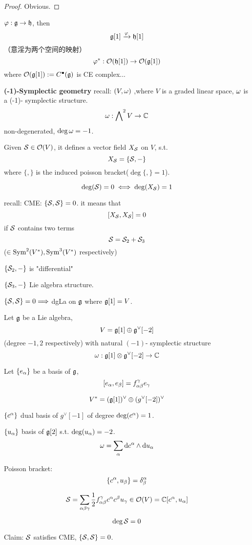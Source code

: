 \begin{proof}
Obvious.
\end{proof}

$\varphi:\mathfrak{g}\to\mathfrak{h}$, then
$$\mathfrak{g}[1]\xrightarrow{\varphi}\mathfrak{h}[1]$$
（意淫为两个空间的映射）
$$\varphi^*:\mathcal{O}(\mathfrak{h}[1])\to\mathcal{O}(\mathfrak{g}[1])$$
where $\mathcal{O}(\mathfrak{g}[1]):=C^{\bullet}(\mathfrak{g})$ is CE complex...

\textbf{(-1)-Symplectic geometry}
recall: $(V,\omega)$ ,where $V$ is a graded linear space, $\omega$ is a (-1)- symplectic structure.
$$\omega:\bigwedge\nolimits^{2}V\to\mathbb{C}$$
non-degenerated, $\deg\omega=-1$.

Given $\mathcal{S}\in\mathcal{O}(V)$, it defines a vector field
$X_{\mathcal{S}}$ on $V$, s.t.
$$X_{\mathcal{S}}=\{\mathcal{S},-\}$$
where $\{,\}$ is the induced poisson bracket($\deg\{,\}=1$).

$$\deg(\mathcal{S})=0\iff\deg(X_{\mathcal{S}})=1$$

recall: CME: $\{\mathcal{S},\mathcal{S}\}=0$. it means that
$$[X_{\mathcal{S}},X_{\mathcal{S}}]=0$$
if $\mathcal{S}$ contains two terms
$$\mathcal{S}=\mathcal{S}_2+\mathcal{S}_3$$
($\in \operatorname{Sym}^2(V^*),\operatorname{Sym}^3(V^*)$ respectively)

$\{\mathcal{S}_2,-\}$ is "differential"

$\{\mathcal{S}_3,-\}$ Lie algebra structure.

$\{\mathcal{S},\mathcal{S}\}=0\Longrightarrow$ dgLa on $\mathfrak{g}$ where $\mathfrak{g}[1]=V$.

\begin{example}
Let $\mathfrak{g}$ be a Lie algebra,
$$V=\mathfrak{g}[1]\oplus\mathfrak{g}^\vee[-2]$$
(degree $-1,2$ respectively)
with natural $(-1)$- symplectic structure
$$\omega:\mathfrak{g}[1]\otimes \mathfrak{g}^\vee[-2]\to\mathbb{C}$$


Let $\{e_\alpha\}$ be a basis of $\mathfrak{g}$,
$$[e_\alpha,e_\beta]=f^\gamma_{\alpha\beta}e_\gamma$$

$$V^*=(\mathfrak{g}[1])^\vee\oplus(g^\vee[-2])^\vee$$

$\{c^\alpha\}$ dual basis of $g^\vee[-1]$ of degree $\deg(c^\alpha)=1$.

$\{u_\alpha\}$ basis of $\mathfrak{g}[2]$ s.t. $\deg(u_\alpha)=-2$.
$$\omega=\sum_{\alpha}\mathrm{d} c^\alpha\wedge\mathrm{d} u_\alpha$$
\end{example}

Poisson bracket:
$$\{c^\alpha,u_\beta\}=\delta^\alpha_\beta$$

$$\mathcal{S}=\sum_{\alpha\beta\gamma}
\frac{1}{2}f_{\alpha\beta}^\gamma c^\alpha c^\beta u_\gamma
\in\mathcal{O}(V)=\mathbb{C}[c^\alpha,u_\alpha]
$$

$$\deg\mathcal{S}=0$$

Claim: $\mathcal{S}$ satisfies CME, $\{\mathcal{S},\mathcal{S}\}=0$.

